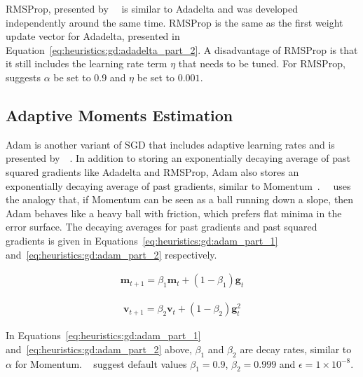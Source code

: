 \Acf{RMSProp}, presented by~\citeauthor{ref:hinton:2012}~\cite{ref:hinton:2012} is similar to \acs{Adadelta}  and was developed independently around the same time. \acs{RMSProp} is the same as the first weight update vector for \acs{Adadelta}, presented in Equation~\eqref{eq:heuristics:gd:adadelta_part_2}. A disadvantage of \acs{RMSProp} is that it still includes the learning rate term $\eta$ that needs to be tuned. For \acs{RMSProp},~\citeauthor{ref:hinton:2012}~\cite{ref:hinton:2012} suggests $\alpha$ be set to 0.9 and $\eta$ be set to $0.001$.


\subsection{Adaptive Moments Estimation}\label{sec:heuristics:adam}

\Acf{Adam} is another variant of \acs{SGD} that includes adaptive learning rates and is presented by~\citeauthor{ref:kingma:2014}~\cite{ref:kingma:2014}. In addition to storing an exponentially decaying average of past squared gradients like \acs{Adadelta} and \acs{RMSProp}, \acs{Adam} also stores an exponentially decaying average of past gradients, similar to \acs{Momentum}~\cite{ref:ruder:2016}.~\citeauthor{ref:heusel:2017}~\cite{ref:heusel:2017} uses the analogy that, if \acs{Momentum} can be seen as a ball running down a slope, then \acs{Adam} behaves like a heavy ball with friction, which prefers flat minima in the error surface. The decaying averages for past gradients and past squared gradients is given in Equations~\eqref{eq:heuristics:gd:adam_part_1} and~\eqref{eq:heuristics:gd:adam_part_2} respectively.

\begin{equation}
	\label{eq:heuristics:gd:adam_part_1}
	\begin{split}
		\boldsymbol{m}_{t+1} = \beta_{1}\boldsymbol{m}_{t} + (1 - \beta_{1})\boldsymbol{g}_{t}
	\end{split}
\end{equation}

\begin{equation}
	\label{eq:heuristics:gd:adam_part_2}
	\begin{split}
		\boldsymbol{v}_{t+1} = \beta_{2}\boldsymbol{v}_{t} + (1 - \beta_{2})\boldsymbol{g}^{2}_{t}
	\end{split}
\end{equation}

In Equations~\eqref{eq:heuristics:gd:adam_part_1} and~\eqref{eq:heuristics:gd:adam_part_2} above, $\beta_{1}$ and $\beta_{2}$ are decay rates, similar to $\alpha$ for \acs{Momentum}. \citeauthor{ref:kingma:2014}~\cite{ref:kingma:2014} suggest default values $\beta_{1}=0.9$, $\beta_{2}=0.999$ and $\epsilon = 1 \times 10^{-8}$.

